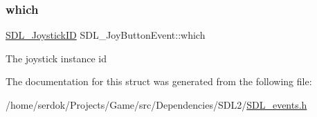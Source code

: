\subsubsection{\texorpdfstring{which}{which}}
{\footnotesize\ttfamily \hyperlink{SDL__joystick_8h_a3c3d32500cb08f76ee8077983912c0bd}{S\+D\+L\+\_\+\+Joystick\+ID} S\+D\+L\+\_\+\+Joy\+Button\+Event\+::which}

The joystick instance id 

The documentation for this struct was generated from the following file\+:\begin{DoxyCompactItemize}
\item 
/home/serdok/\+Projects/\+Game/src/\+Dependencies/\+S\+D\+L2/\hyperlink{SDL__events_8h}{S\+D\+L\+\_\+events.\+h}\end{DoxyCompactItemize}
